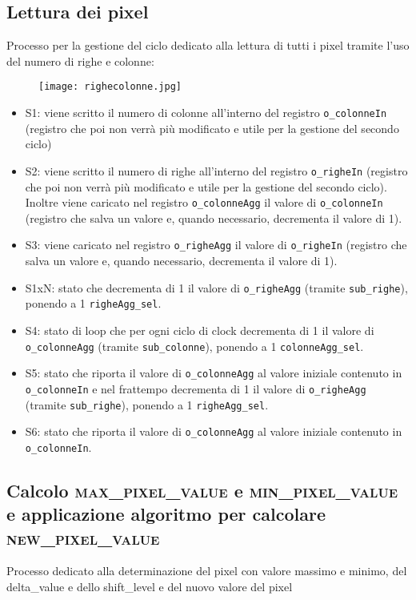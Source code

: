\documentclass[12pt, table, xcdraw]{article}
\begin{document}
\newpage
\subsection{Lettura dei pixel}
Processo per la gestione del ciclo dedicato alla lettura di tutti i pixel tramite l'uso del numero di righe e colonne:

\begin{figure}[h!]
  \texttt{[image: righecolonne.jpg]}

\end{figure}
\FloatBarrier

\begin{itemize}
\item S1: viene scritto il numero di colonne all'interno del registro \texttt{o\_colonneIn} (registro che poi non verrà più modificato e utile per la gestione del secondo ciclo)
\item S2: viene scritto il numero di righe all'interno del registro \texttt{o\_righeIn} (registro che poi non verrà più modificato e utile per la gestione del secondo ciclo). Inoltre viene caricato nel registro \texttt{o\_colonneAgg} il valore di \texttt{o\_colonneIn} (registro che salva un valore e, quando necessario, decrementa il valore di 1). 
\item S3: viene caricato nel registro \texttt{o\_righeAgg} il valore di \texttt{o\_righeIn} (registro che salva un valore e, quando necessario, decrementa il valore di 1).
\item S1xN: stato che decrementa di 1 il valore di \texttt{o\_righeAgg} (tramite \texttt{sub\_righe}), ponendo a 1 \texttt{righeAgg\_sel}.
\item S4: stato di loop che per ogni ciclo di clock decrementa di 1 il valore di \texttt{o\_colonneAgg} (tramite \texttt{sub\_colonne}), ponendo a 1 \texttt{colonneAgg\_sel}. 
\item S5: stato che riporta il valore di \texttt{o\_colonneAgg} al valore iniziale contenuto in \texttt{o\_colonneIn} e nel frattempo decrementa di 1 il valore di \texttt{o\_righeAgg} (tramite \texttt{sub\_righe}), ponendo a 1 \texttt{righeAgg\_sel}.
\item S6: stato che riporta il valore di \texttt{o\_colonneAgg} al valore iniziale contenuto in \texttt{o\_colonneIn}.
\end{itemize}

\newpage
\subsection{Calcolo \textsc{max\_pixel\_value} e \textsc{min\_pixel\_value} e applicazione algoritmo per calcolare \textsc{new\_pixel\_value}}
Processo dedicato alla determinazione del pixel con valore massimo e minimo, del delta\_value e dello shift\_level e del nuovo valore del pixel
\end{document}
